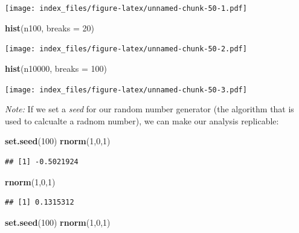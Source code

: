 \documentclass[]{article}
\newenvironment{Shaded}{\begin{snugshade}}{\end{snugshade}}
\newcommand{\DataTypeTok}[1]{\textcolor[rgb]{0.13,0.29,0.53}{#1}}
\newcommand{\DecValTok}[1]{\textcolor[rgb]{0.00,0.00,0.81}{#1}}
\newcommand{\KeywordTok}[1]{\textcolor[rgb]{0.13,0.29,0.53}{\textbf{#1}}}
\newcommand{\NormalTok}[1]{#1}
\begin{document}
\texttt{[image: index\_files/figure-latex/unnamed-chunk-50-1.pdf]}

\begin{Shaded}
\begin{Highlighting}[]
\KeywordTok{hist}\NormalTok{(n100, }\DataTypeTok{breaks =} \DecValTok{20}\NormalTok{)}
\end{Highlighting}
\end{Shaded}

\texttt{[image: index\_files/figure-latex/unnamed-chunk-50-2.pdf]}

\begin{Shaded}
\begin{Highlighting}[]
\KeywordTok{hist}\NormalTok{(n10000, }\DataTypeTok{breaks =} \DecValTok{100}\NormalTok{)}
\end{Highlighting}
\end{Shaded}

\texttt{[image: index\_files/figure-latex/unnamed-chunk-50-3.pdf]}

\emph{Note:} If we set a \emph{seed} for our random number generator
(the algorithm that is used to calcualte a radnom number), we can make
our analysis replicable:

\begin{Shaded}
\begin{Highlighting}[]
\KeywordTok{set.seed}\NormalTok{(}\DecValTok{100}\NormalTok{)}
\KeywordTok{rnorm}\NormalTok{(}\DecValTok{1}\NormalTok{,}\DecValTok{0}\NormalTok{,}\DecValTok{1}\NormalTok{)}
\end{Highlighting}
\end{Shaded}

\begin{verbatim}
## [1] -0.5021924
\end{verbatim}

\begin{Shaded}
\begin{Highlighting}[]
\KeywordTok{rnorm}\NormalTok{(}\DecValTok{1}\NormalTok{,}\DecValTok{0}\NormalTok{,}\DecValTok{1}\NormalTok{)}
\end{Highlighting}
\end{Shaded}

\begin{verbatim}
## [1] 0.1315312
\end{verbatim}

\begin{Shaded}
\begin{Highlighting}[]
\KeywordTok{set.seed}\NormalTok{(}\DecValTok{100}\NormalTok{)}
\KeywordTok{rnorm}\NormalTok{(}\DecValTok{1}\NormalTok{,}\DecValTok{0}\NormalTok{,}\DecValTok{1}\NormalTok{)}
\end{Highlighting}
\end{Shaded}
\end{document}
